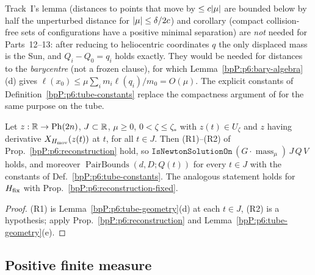\begin{remark}\label{bpP:p6:vs-I}
Track~I's lemma  (distances to points that move by $\le c\lvert \mu\rvert$ are bounded below by half the unperturbed distance for $\lvert \mu\rvert\le\delta/2c$) and corollary  (compact collision-free sets of configurations have a positive minimal separation) are \emph{not} needed for Parts~12--13: after reducing to heliocentric coordinates $q$ the only displaced mass is the Sun, and $Q_i-Q_0=q_i$ holds exactly. They would be needed for distances to the \emph{barycentre} (not a frozen clause), for which Lemma~\ref{bpP:p6:bary-algebra}(d) gives $\ell(x_0)\le\mu\sum_im_i\ell(q_i)/m_0=O(\mu)$. The explicit constants of Definition~\ref{bpP:p6:tube-constants} replace the compactness argument of  for the same purpose on the tube.
\end{remark}

\begin{corollary}\label{bpP:p6:newton-in-tube}
Let $z:\mathbb{R}\to\mathrm{Ph}(2n)$, $J\subset\mathbb{R}$, $\mu\ge0$, $0<\zeta\le\zeta_*$ with $z(t)\in U_\zeta$ and $z$ having derivative $X_{H_{\rm mov}}(z(t))$ at $t$, for all $t\in J$. Then (R1)--(R2) of Prop.~\ref{bpP:p6:reconstruction} hold, so $\texttt{IsNewtonSolutionOn}\,(G\cdot\operatorname{mass}_\mu)\,J\,Q\,V$ holds, and moreover $\operatorname{PairBounds}(d,D;Q(t))$ for every $t\in J$ with the constants of Def.~\ref{bpP:p6:tube-constants}. The analogous statement holds for $H_{\rm fix}$ with Prop.~\ref{bpP:p6:reconstruction-fixed}.
\end{corollary}
\begin{proof}
(R1) is Lemma~\ref{bpP:p6:tube-geometry}(d) at each $t\in J$, (R2) is a hypothesis; apply Prop.~\ref{bpP:p6:reconstruction} and Lemma~\ref{bpP:p6:tube-geometry}(e).
\end{proof}

\subsection{Positive finite measure}\label{bpP:p6:measure}

